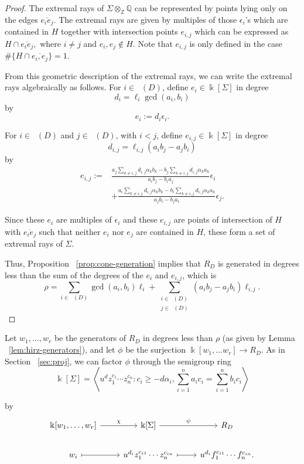 \documentclass{amsart}
\theoremstyle{plain}
\theoremstyle{definition}
\theoremstyle{remark}
\numberwithin{equation}{section}
\newcommand\bq{{\mathbb Q}}
\newcommand\bz{{\mathbb Z}}
\newcommand\bk{{\Bbbk}}
\newcommand\bida{a}
\newcommand\bidb{b}
\DeclareMathOperator{\Te}{T_=}
\DeclareMathOperator{\Tp}{T_+}
\DeclareMathOperator{\Tm}{T_-}
\begin{document}
\begin{proof}
The extremal rays of $\Sigma \otimes_\bz \bq$ can be represented by points
lying only on the edges 
$\overline{e_i e_j}$.
The extremal rays are given by multiples of those $\epsilon_i$'s
which are contained in $H$ together with intersection points $e_{i, j}$ which
can be expressed as $H \cap \overline{e_i e_j},$ where $i \neq j$ and $e_i,
e_j \notin H$. Note that $e_{i,j}$ is only defined in the case
$\# \{H \cap \overline{e_i, e_j}\} = 1$.


From this geometric description of the extremal rays, we can write
the extremal rays algebraically as follows.
For $i \in \Te(D)$, define $e_i \in \bk[\Sigma]$ in degree 
\[
	d_i = \ell_i \gcd(a_i, b_i)
\]
by 
\[
	e_i := d_i \epsilon_i.
\]

\noindent
For $i \in \Tp(D)$ and $j \in \Tm(D)$, with $i < j$, define $e_{i,j}\in \bk[\Sigma]$ in degree 
\[
	d_{i,j} = \ell_{i, j}(\bida_i \bidb_j - \bida_j \bidb_i)
\]
by
\begin{align*}
e_{i,j} := &\frac{a_j\sum_{k\ne i,j} d_{i,j}\alpha_k b_k - b_j\sum_{k \ne i,j} d_{i,j} \alpha_k a_k}{a_ib_j - b_i a_j} \epsilon_i \\
&+ \frac{a_i \sum_{k\ne i,j} d_{i,j} \alpha_k b_k - b_i\sum_{k\ne i,j} d_{i,j} \alpha_ka_k}{a_jb_i - b_j a_i} \epsilon_j.
\end{align*}

Since these $e_i$ are multiples of $\epsilon_i$ and these
$e_{i,j}$ are points of intersection of $H$ with
$\overline {e_ie_j}$ such that neither $e_i$ nor $e_j$
are contained in $H$, these form a set of extremal rays of $\Sigma$.

Thus, Proposition ~\ref{prop:cone-generation} implies that 
$R_D$ is generated in 
degrees less than the sum of the degrees of the $e_i$ and $e_{i,j}$, which is
\[
	\rho = \sum_{i\in \Te(D)} \gcd(\bida_i, \bidb_i)\ell_i + \sum_{\substack{
	i \in \Tp(D) \\	j \in \Tm(D)}} (\bida_i \bidb_j- \bida_j \bidb_i)\ell_{i,j}.
\]
\end{proof}

Let $w_1, \ldots, w_r$ be the generators of $R_D$ in degrees less than $\rho$
(as given by Lemma ~\ref{lem:hirz-generators}), and let $\phi$ be the
surjection $\bk[w_1, \ldots w_r] \to R_D$. As in Section ~\ref{sec:proj}, we can factor $\phi$ through the
semigroup ring 
\[
	\bk[\Sigma] = \left \langle u^d z_1^{c_1} \cdots z_n^{c_n} \colon c_i \geq -d
	\alpha_i, \sum_{i=1}^{n} \bida_i c_i = \sum_{i=1}^{n} \bidb_i c_i
	\right \rangle
\]

\noindent
by
\[
\begin{tikzcd}
	\bk[w_1,\ldots, w_r] \ar {r}{\chi} & \bk[\Sigma] \ar {r}{\psi} & R_D \\
	w_i \ar[mapsto]{r} & u^{d_i}z_1^{c_{i1}} \cdots z_n^{c_{in}} \ar[mapsto]{r} & u^{d_i}f_1^{c_{i1}} \cdots f_n^{c_{in}}.
\end{tikzcd}
\]
\end{document}
